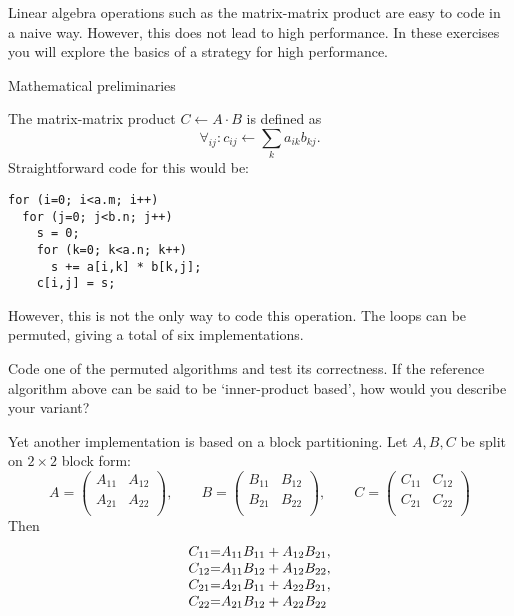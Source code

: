 

Linear algebra operations such as the matrix-matrix product are easy
to code in a naive way. However, this does not lead to high
performance. In these exercises you will explore the basics of a
strategy for high performance.

 {Mathematical preliminaries}

The matrix-matrix product $C\leftarrow A\cdot B$ is defined as
\[ \forall_{ij}\colon c_{ij}\leftarrow \sum_k a_{ik}b_{kj}. \]
Straightforward code for this would be:
\begin{lstlisting}
for (i=0; i<a.m; i++)
  for (j=0; j<b.n; j++)
    s = 0;
    for (k=0; k<a.n; k++)
      s += a[i,k] * b[k,j];
    c[i,j] = s;
\end{lstlisting}
However, this is not the only way to code this operation.
The loops can be permuted, giving a total of six implementations.

\begin{exercise}
  Code one of the permuted algorithms and test its correctness. If the
  reference algorithm above can be said to be `inner-product based',
  how would you describe your variant?
\end{exercise}

Yet another implementation is based on a block partitioning. Let
$A,B,C$ be split on $2\times 2$ block form:
\[
A=
\begin{pmatrix}
  A_{11}&A_{12}\\ A_{21}&A_{22}\\
\end{pmatrix},\qquad
B=
\begin{pmatrix}
  B_{11}&B_{12}\\ B_{21}&B_{22}\\
\end{pmatrix},\qquad
C=
\begin{pmatrix}
  C_{11}&C_{12}\\ C_{21}&C_{22}\\
\end{pmatrix}
\]
Then
\begin{equation}
  \begin{array}{r@{=}l}
    C_{11}&A_{11}B_{11}+A_{12}B_{21},\\
    C_{12}&A_{11}B_{12}+A_{12}B_{22},\\
    C_{21}&A_{21}B_{11}+A_{22}B_{21},\\
    C_{22}&A_{21}B_{12}+A_{22}B_{22}\\
  \end{array}
  \label{eq:22matprod}
\end{equation}

